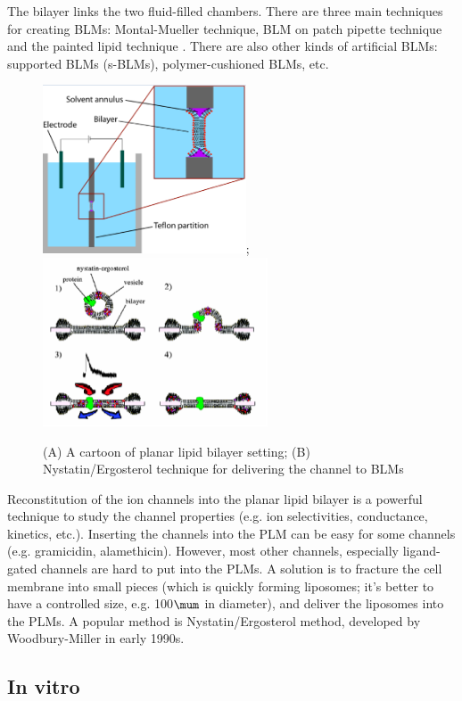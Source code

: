 The bilayer links the two fluid-filled chambers. There are three main techniques
for creating BLMs: Montal-Mueller technique, BLM on patch pipette technique and
the painted lipid technique \citep{lodesani2008}. There are also other kinds of
artificial BLMs: supported BLMs (s-BLMs), polymer-cushioned BLMs, etc.

\begin{figure}[hbt]
  \centerline{\includegraphics[height=5cm,
    angle=0]{./images/planar_lipidbilayer.eps};
    \includegraphics[height=5cm,
    angle=0]{./images/NE_technique.eps}}
  \caption{(A) A cartoon of planar lipid bilayer setting; (B)
  Nystatin/Ergosterol technique for delivering the channel to BLMs}
  \label{fig:planar-lipidbilayer}
\end{figure}

Reconstitution of the ion channels into the planar lipid bilayer is a powerful
technique to study the channel properties (e.g. ion selectivities, conductance,
kinetics, etc.). Inserting the channels into the PLM can be easy for some
channels (e.g. gramicidin, alamethicin). However, most other channels,
especially ligand-gated channels are hard to put into the PLMs. A solution is to
fracture the cell membrane into small pieces (which is quickly forming
liposomes; it's better to have a controlled size, e.g. 100$\mum$ in diameter),
and deliver the liposomes into the PLMs. A popular method is Nystatin/Ergosterol
method, developed by Woodbury-Miller in early 1990s.

\subsection{In vitro}

